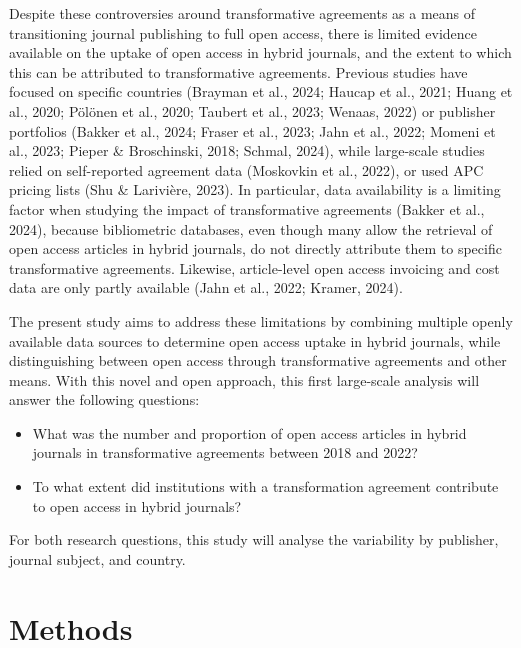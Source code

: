 \documentclass[a4paper,man,floatsintext,longtable,noextraspace,12pt]{apa6}
\providecommand{\tightlist}{%
  \setlength{\itemsep}{0pt}\setlength{\parskip}{0pt}}
\begin{document}
Despite these controversies around transformative agreements as a means
of transitioning journal publishing to full open access, there is
limited evidence available on the uptake of open access in hybrid
journals, and the extent to which this can be attributed to
transformative agreements. Previous studies have focused on specific
countries (Brayman et al., 2024; Haucap et al., 2021; Huang et al.,
2020; Pölönen et al., 2020; Taubert et al., 2023; Wenaas, 2022) or
publisher portfolios (Bakker et al., 2024; Fraser et al., 2023; Jahn et
al., 2022; Momeni et al., 2023; Pieper \& Broschinski, 2018; Schmal,
2024), while large-scale studies relied on self-reported agreement data
(Moskovkin et al., 2022), or used APC pricing lists (Shu \& Larivière,
2023). In particular, data availability is a limiting factor when
studying the impact of transformative agreements (Bakker et al., 2024),
because bibliometric databases, even though many allow the retrieval of
open access articles in hybrid journals, do not directly attribute them
to specific transformative agreements. Likewise, article-level open
access invoicing and cost data are only partly available (Jahn et al.,
2022; Kramer, 2024).

The present study aims to address these limitations by combining
multiple openly available data sources to determine open access uptake
in hybrid journals, while distinguishing between open access through
transformative agreements and other means. With this novel and open
approach, this first large-scale analysis will answer the following
questions:

\begin{itemize}
\tightlist
\item
  What was the number and proportion of open access articles in hybrid
  journals in transformative agreements between 2018 and 2022?
\item
  To what extent did institutions with a transformation agreement
  contribute to open access in hybrid journals?
\end{itemize}

For both research questions, this study will analyse the variability by
publisher, journal subject, and country.

\hypertarget{methods}{%
\section{Methods}\label{methods}}
\end{document}
